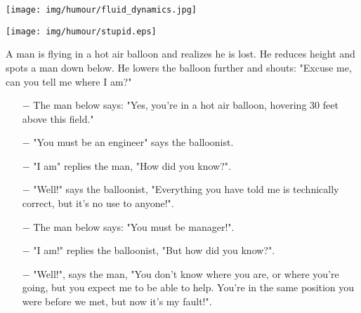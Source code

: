 	\begin{center}\underline{\hspace{5 cm}}\end{center}

	\begin{center}
		\texttt{[image: img/humour/fluid\_dynamics.jpg]}
	\end{center}
	
	\begin{center}\underline{\hspace{5 cm}}\end{center}

	\begin{center}
		\texttt{[image: img/humour/stupid.eps]}
	\end{center}
	
	\begin{center}\underline{\hspace{5 cm}}\end{center}

	A man is flying in a hot air balloon and realizes he is lost. He reduces height and spots a man down below. He lowers the balloon further and shouts: "Excuse me, can you tell me where I am?" 
	\begin{itemize}
		\item[$-$] The man below says: "Yes, you're in a hot air balloon, hovering 30 feet above this field." 
	
		\item[$-$] "You must be an engineer" says the balloonist. 
	
		\item[$-$] "I am" replies the man, "How did you know?".
	
		\item[$-$] "Well!" says the balloonist, "Everything you have told me is technically correct, but it's no use to anyone!". 
	
		\item[$-$] The man below says: "You must be manager!". 
	
		\item[$-$] "I am!" replies the balloonist, "But how did you know?".
	
		\item[$-$] "Well!", says the man, "You don't know where you are, or where you're going, but you expect me to be able to help. You're in the same position you were before we met, but now it's my fault!". 
	\end{itemize}
	
